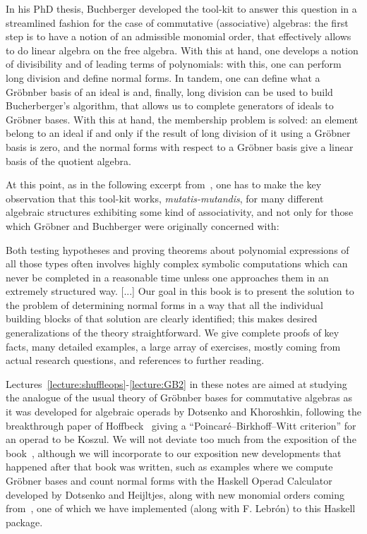 \documentclass[fleqn, a4paper, twoside]{article}
\makeatletter
\newcommand{\0}{\langle 0\rangle}
\let\[\@undefined
\DeclareRobustCommand{\[}{\begin{equation}}%
\let\]\@undefined
\DeclareRobustCommand{\]}{\end{equation}}%
\theoremstyle{mytheorem}
\theoremstyle{introthm}
\theoremstyle{mydefinition}
\theoremstyle{mydefinition2}
\theoremstyle{plain} %
\newcommand{\?}{\,?\,}
\theoremstyle{mytheorem}
\theoremstyle{plain} %
\newcommand\claim[2][.8]{%
  \begin{minipage}{#1\displaywidth}%
  \itshape
  #2
  \end{minipage}%
}
\makeatother
\begin{document}
In his PhD thesis, Buchberger developed the tool-kit to 
answer this question in a streamlined fashion for the case
of commutative (associative) algebras: the first step is
to have a notion of an admissible monomial order, that
effectively allows to do linear algebra on the free algebra.
With this at hand, one develops a notion of divisibility
and of leading terms of polynomials: with this, one can
perform long division and define normal forms. 
In tandem, one can define what a 
Gr\"obnber basis of an ideal is and, finally, long division 
can be used to build Bucherberger's algorithm, that allows
us to complete generators of ideals to Gr\"obner bases.
With this at hand, the membership problem is solved:
an element belong to an ideal if and only if the result
of long division of it using a Gr\"obner basis is zero,
and the normal forms with respect to a Gr\"obner basis give
a linear basis of the quotient algebra.

At this point, as in the following excerpt from~\cite{Bremner2016},
one has to make the key observation that this tool-kit works,
\emph{mutatis-mutandis}, for many different algebraic structures
exhibiting some kind of associativity, and not only for
those which Gr\"obner and Buchberger were originally concerned with:
\[\claim{
Both testing hypotheses and proving theorems about polynomial expressions of all those types often involves highly complex symbolic computations which can never be completed in a reasonable time unless one approaches them in an extremely structured way. [...] Our goal in this book is to present the solution 
to the problem of determining normal forms in a way that all the individual building blocks 
of that solution are clearly identified; this makes desired 
generalizations of the theory straightforward. We give complete proofs of key 
facts, many detailed examples, a large array of exercises, mostly coming from 
actual research questions, and references to further reading.}
\]

Lectures~\ref{lecture:shuffleops}-\ref{lecture:GB2} in these
notes are aimed at studying the analogue of the usual
theory of Gr\"obnber bases for commutative algebras as it was
developed for algebraic operads by Dotsenko and Khoroshkin, 
following the breakthrough paper of Hoffbeck~\cite{Hoffbeck2009}
giving a ``Poincar\'e--Birkhoff--Witt criterion'' for an operad
to be Koszul. We will not deviate too much from the exposition of the 
book~\cite{Bremner2016}, although we will incorporate to our
exposition new developments that happened after that book
was written, such as examples where we compute
Gr\"obner bases and count normal forms 
with the \textsf{Haskell Operad Calculator}
developed by Dotsenko and Heijltjes, along with new
monomial orders coming from~\cite{Dotsenko2020},
one of which we have implemented (along with F. Lebr\'on)
to this \textsf{Haskell} package. 
\end{document}
